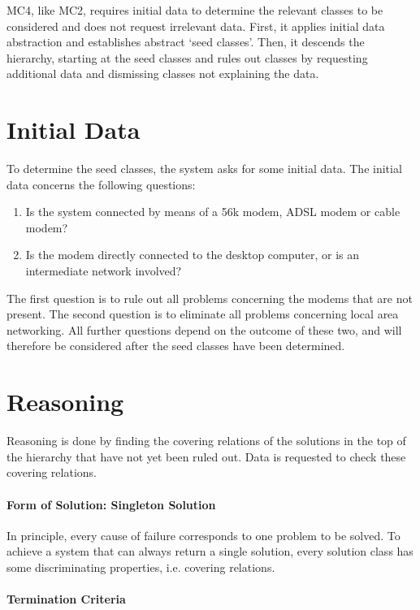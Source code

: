 \documentclass[a4paper,11pt]{article}
\begin{document}
MC4, like MC2, requires initial data to determine the relevant classes to be
considered and does not request irrelevant data. First, it applies initial data
abstraction and establishes abstract `seed classes'. Then, it descends the
hierarchy, starting at the seed classes and rules out classes by requesting
additional data and dismissing classes not explaining the data.


\section*{Initial Data}

To determine the seed classes, the system asks for some initial data. The
initial data concerns the following questions:
\begin{enumerate}
\item Is the system connected by means of a 56k modem, ADSL modem or cable
  modem?
\item Is the modem directly connected to the desktop computer, or is an
  intermediate network involved?
\end{enumerate}

The first question is to rule out all problems concerning the modems that are
not present. The second question is to eliminate all problems concerning local
area networking. All further questions depend on the outcome of these two, and
will therefore be considered after the seed classes have been determined.


\section*{Reasoning}

Reasoning is done by finding the covering relations of the solutions in the
top of the hierarchy that have not yet been ruled out. Data is requested to
check these covering relations.

\paragraph{Form of Solution: Singleton Solution}

In principle, every cause of failure corresponds to one problem to be
solved. To achieve a system that can always return a single solution, every
solution class has some discriminating properties, i.e. covering relations.

\paragraph{Termination Criteria}
\end{document}

